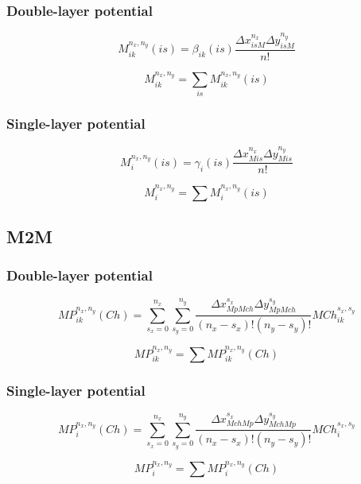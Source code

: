\documentclass[letter,10pt]{article}
\begin{document}
\subsubsection{Double-layer potential}

\begin{equation}
M_{ik}^{n_x,n_y}(is) = \beta_{ik}(is)\frac{\Delta x_{isM}^{n_x}\Delta y_{isM}^{n_y}}{n!}
\end{equation}

$$M_{ik}^{n_x,n_y} = \sum_{is} M_{ik}^{n_x,n_y}(is)$$

\subsubsection{Single-layer potential}

\begin{equation}
M_{i}^{n_x,n_y}(is) = \gamma_{i}(is)\frac{\Delta x_{Mis}^{n_x}\Delta y_{Mis}^{n_y}}{n!}
\end{equation}

$$M_{i}^{n_x,n_y} = \sum M_{i}^{n_x,n_y}(is)$$

\subsection{M2M}

\subsubsection{Double-layer potential}

\begin{equation}
MP_{ik}^{n_x,n_y}(Ch) = \sum_{s_x=0}^{n_x}\sum_{s_y=0}^{n_y}\frac{\Delta x_{MpMch}^{s_x}\Delta y_{MpMch}^{s_y}}{(n_x-s_x)!(n_y-s_y)!}MCh_{ik}^{s_x,s_y}
\end{equation}

$$MP_{ik}^{n_x,n_y}=\sum MP_{ik}^{n_x,n_y}(Ch)$$

\subsubsection{Single-layer potential}

\begin{equation}
MP_{i}^{n_x,n_y}(Ch) = \sum_{s_x=0}^{n_x}\sum_{s_y=0}^{n_y}\frac{\Delta x_{MchMp}^{s_x}\Delta y_{MchMp}^{s_y}}{(n_x-s_x)!(n_y-s_y)!}MCh_{i}^{s_x,s_y}
\end{equation}

$$MP_{i}^{n_x,n_y}=\sum MP_{i}^{n_x,n_y}(Ch)$$
\end{document}
